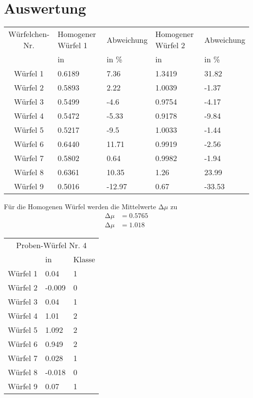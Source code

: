 \section{Auswertung}
\label{sec:Auswertung}

\begin{table}
  \centering
  \begin{tabular}{cllll}
    \toprule
    {Würfelchen-Nr.} & {Homogener Würfel 1}&{Abweichung} & {Homogener Würfel 2}& {Abweichung}\\
    {}&{in} &{in \%} &{in} &{in \%}\\
    \midrule
    Würfel 1&   0.6189&   7.36 &  1.3419&    31.82\\
    Würfel 2&   0.5893&   2.22 &  1.0039&    -1.37\\
    Würfel 3&   0.5499&   -4.6 &  0.9754&    -4.17\\
    Würfel 4&   0.5472&   -5.33&  0.9178&    -9.84\\
    Würfel 5&   0.5217&   -9.5 &  1.0033&    -1.44\\
    Würfel 6&   0.6440&   11.71&  0.9919&    -2.56\\
    Würfel 7&   0.5802&   0.64 &  0.9982&    -1.94\\
    Würfel 8&   0.6361&   10.35&  1.26&    23.99\\
    Würfel 9&   0.5016&   -12.97& 0.67&    -33.53\\
    \bottomrule
  \end{tabular}
\end{table}

Für die Homogenen Würfel werden die Mittelwerte $\mathup\Delta \mu$ zu
\begin{align}
  \mathup\Delta \mu &= 0.5765\\
  \mathup\Delta \mu &= 1.018
  \label{wert:homogen}
\end{align}

\begin{table}
  \centering
  \begin{tabular}{cll}
    \toprule
    \multicolumn{3}{c}{Proben-Würfel Nr. 4}\\
    {}&{in} &{Klasse}\\
    \midrule
    Würfel 1&   0.04&   1\\
    Würfel 2&   -0.009&   0\\
    Würfel 3&   0.04&   1\\
    Würfel 4&   1.01&   2\\
    Würfel 5&   1.092&    2\\
    Würfel 6&   0.949&    2\\
    Würfel 7&   0.028&    1\\
    Würfel 8&   -0.018&   0\\
    Würfel 9&   0.07&   1\\
    \bottomrule
  \end{tabular}
\end{table}
